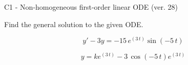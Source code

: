 \begin{exercise}
  \begin{exerciseTitle}C1 - Non-homogeneous first-order linear ODE (ver. 28)\end{exerciseTitle}
  \begin{exerciseStatement}
    
Find the general solution to the given ODE.

    
\[y'-3y= -15 \, e^{\left(3 \, t\right)} \sin\left(-5 \, t\right)\]

  \end{exerciseStatement}
  \begin{exerciseAnswer}
    
\[y= k e^{\left(3 \, t\right)} - 3 \, \cos\left(-5 \, t\right) e^{\left(3 \, t\right)}\]

  \end{exerciseAnswer}
\end{exercise}